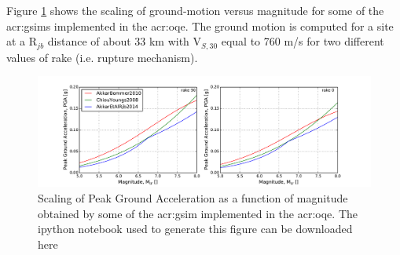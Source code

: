 Figure \ref{fig:gsim_mag_scaling} shows the scaling of ground-motion versus 
magnitude for some of the \glspl{acr:gsim} implemented in the \gls{acr:oqe}.
The ground motion is computed for a site at a R$_{jb}$ distance of about 33 km
with V$_{S,30}$ equal to 760 m/s for two different values of rake (i.e. 
rupture mechanism).
\begin{figure}[hb]
\centering
\includegraphics[trim = 23mm 0mm 23mm 5mm, clip,width=\textwidth]
    {./Pictures/gsim/mag_scaling_example.pdf}
\caption{Scaling of Peak Ground Acceleration as a function of magnitude 
    obtained by some of the \gls{acr:gsim} implemented in the \gls{acr:oqe}. 
    The ipython notebook used to generate this figure can be downloaded here 
    \href{}{}}
\label{fig:gsim_mag_scaling}
\end{figure}
%
